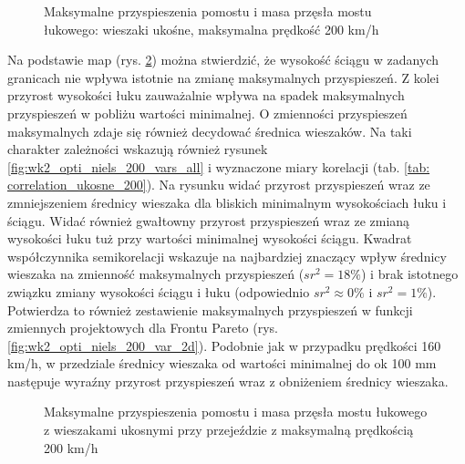 \begin{figure}[hbt!]
	\centering
	\captionsetup{justification=centering}
	\caption{Maksymalne przyspieszenia pomostu i masa przęsła mostu łukowego: wieszaki ukośne, maksymalna prędkość 200 km/h}
	\label{fig:wk2_opti_niels_200_all}
\end{figure}

Na podstawie map (rys. \ref{fig:wk2_opti_niels_200_variables}) można stwierdzić, że wysokość ściągu w zadanych granicach nie wpływa istotnie na zmianę maksymalnych przyspieszeń. Z kolei przyrost wysokości łuku zauważalnie wpływa na spadek maksymalnych przyspieszeń w pobliżu wartości minimalnej. O zmienności przyspieszeń maksymalnych zdaje się również decydować średnica wieszaków. Na taki charakter zależności wskazują również rysunek \ref{fig:wk2_opti_niels_200_vars_all} i wyznaczone miary korelacji (tab. \ref{tab: correlation_ukosne_200}). Na rysunku widać przyrost przyspieszeń wraz ze zmniejszeniem średnicy wieszaka dla bliskich minimalnym wysokościach łuku i ściągu. Widać również gwałtowny przyrost przyspieszeń wraz ze zmianą wysokości łuku tuż przy wartości minimalnej wysokości ściągu. Kwadrat współczynnika semikorelacji wskazuje na najbardziej znaczący wpływ średnicy wieszaka na zmienność maksymalnych przyspieszeń ($sr^2=18\%$) i brak istotnego związku zmiany wysokości ściągu i łuku (odpowiednio $sr^2 \approx 0\%$ i $sr^2=1 \%$). Potwierdza to również zestawienie maksymalnych przyspieszeń w funkcji zmiennych projektowych dla Frontu Pareto (rys. \ref{fig:wk2_opti_niels_200_var_2d}). Podobnie jak w przypadku prędkości 160 km/h, w przedziale średnicy wieszaka od wartości minimalnej do ok 100 mm następuje wyraźny przyrost przyspieszeń wraz z obniżeniem średnicy wieszaka.

\begin{figure}[hbt!]
	\centering
	\captionsetup{justification=centering}
	\caption{Maksymalne przyspieszenia pomostu i masa przęsła mostu łukowego z wieszakami ukosnymi przy przejeździe z maksymalną prędkością 200 km/h}
	\label{fig:wk2_opti_niels_200_variables}
\end{figure}

